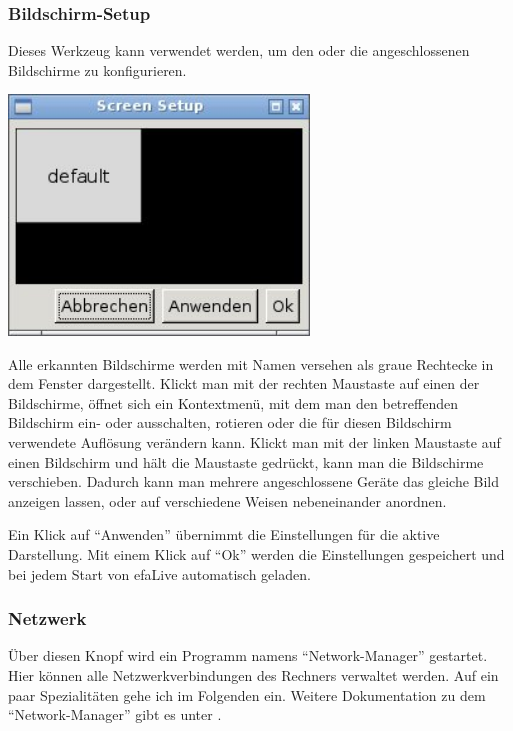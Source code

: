 \documentclass[a4paper,12pt,twoside]{article}
\begin{document}
\subsubsection{Bildschirm-Setup}
\label{sct:bildschirm}
Dieses Werkzeug kann verwendet werden, um den oder die angeschlossenen
Bildschirme zu konfigurieren.

\begin{minipage}{\linewidth}
    \centering
    \captionsetup{type=figure}
    \includegraphics[width=8cm]{screenshots/efaLivede-img22.jpg}
    \label{fig:bildschirm}
\end{minipage}
\bigskip

Alle erkannten Bildschirme werden mit Namen versehen als graue Rechtecke
in dem Fenster dargestellt. Klickt man mit der rechten Maustaste auf
einen der Bildschirme, öffnet sich ein Kontextmenü, mit dem man den
betreffenden Bildschirm ein- oder ausschalten, rotieren oder die für
diesen Bildschirm verwendete Auflösung verändern kann. Klickt man mit
der linken Maustaste auf einen Bildschirm und hält die Maustaste
gedrückt, kann man die Bildschirme verschieben. Dadurch kann man
mehrere angeschlossene Geräte das gleiche Bild anzeigen lassen, oder
auf verschiedene Weisen nebeneinander anordnen.

Ein Klick auf "`Anwenden"' übernimmt die
Einstellungen für die aktive Darstellung. Mit einem Klick auf
"`Ok"' werden die Einstellungen gespeichert
und bei jedem Start von efaLive automatisch geladen.


\subsubsection{Netzwerk}
\label{sct:dialog_netzwerk}
Über diesen Knopf wird ein Programm namens
"`Network-Manager"' gestartet. Hier können
alle Netzwerkverbindungen des Rechners verwaltet werden. Auf ein paar
Spezialitäten gehe ich im Folgenden ein. Weitere Dokumentation zu dem
"`Network-Manager"' gibt es unter \cite{NWM1}.
\end{document}
